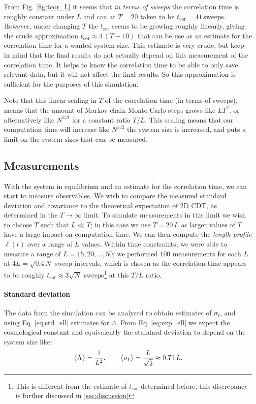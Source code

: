 From Fig. \ref{fig:tcor_L} it seems that \emph{in terms of sweeps} the correlation time is roughly constant under $L$ and can at $T = 20$ taken to be $t_\text{cor} = 41 \, \text{sweeps}$.
However, under changing $T$ the $t_\text{cor}$ seems to be growing roughly linearly, giving the crude approximation $t_\text{cor} \approx 4\, (T - 10)$ that can be use as an estimate for the correlation time for a wanted system size.
This estimate is very crude, but keep in mind that the final results do not actually depend on this measurement of the correlation time. It helps to know the correlation time to be able to only save relevant data, but it will not affect the final results.
So this approximation is sufficient for the purposes of this simulation.

Note that this linear scaling in $T$ of the correlation time (in terms of sweeps), means that the amount of Markov-chain Monte Carlo steps grows like $LT^2$, or alternatively like $N^{3/2}$ for a constant ratio $T/L$. This scaling means that our computation time will increase like $N^{3/2}$ the system size is increased, and puts a limit on the system sizes that can be measured.


\subsection{Measurements}
With the system in equilibrium and an estimate for the correlation time, we can start to measure observables.
We wish to compare the measured standard deviation and covariance to the theoretical expectation of 2D CDT, as determined in the $T \rightarrow \infty$ limit.
To simulate measurements in this limit we wish to choose $T$ such that $L \ll T$; in this case we use $T = 20 \, L$ as larger values of $T$ have a large impact on computation time.
We can then compute the \emph{length profile} $\ell(t)$ over a range of $L$ values.
Within time constraints, we were able to measure a range of $L = 15, 20, \dots, 50$; we performed $100$ measurements for each $L$ at $ 4 L = \sqrt{0.4 \, N}$ sweep intervals, which is chosen as the correlation time appears to be roughly $t_\text{cor} \approx 3 \sqrt{N}$ sweeps\footnote{This is different from the estimate of $t_\text{cor}$ determined before, this discrepancy is further discussed in \ref{sec:discussion}} at this $T/L$ ratio.

\paragraph{Standard deviation}
The data from the simulation can be analysed to obtain estimates of $\sigma_\ell$, and using Eq. \eqref{eq:std_ell} estimates for $\Lambda$.
From Eq. \eqref{eq:exp_ell} we expect the cosmological constant and equivalently the standard deviation to depend on the system size like:
\begin{equation}\label{eq:std_theory}
    \big\langle \Lambda \big\rangle = \frac{1}{L^2}, \qquad \big\langle \sigma_\ell \big\rangle = \frac{L}{\sqrt{2}} \approx 0.71 \, L.
\end{equation}

